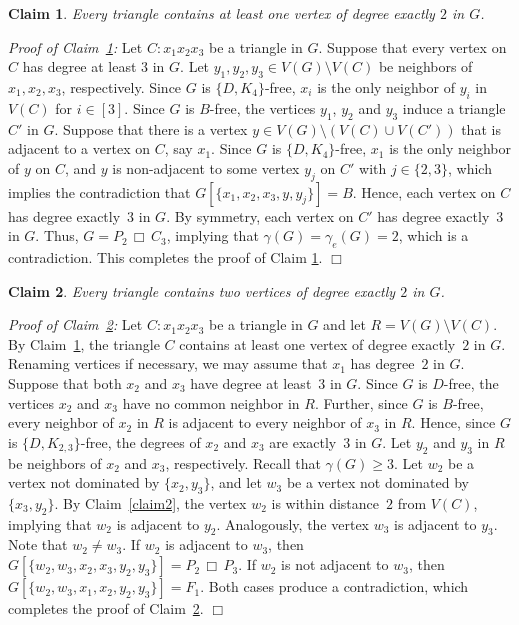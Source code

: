 \documentclass[12pt]{article}
\newtheorem{claim}{Claim}
\newcommand{\cart}{\, \Box \,}
\begin{document}
\begin{claim}\label{claim3}
Every triangle contains at least one vertex of degree exactly $2$ in $G$.
\end{claim}
{\it Proof of Claim~\ref{claim3}:}
Let $C \colon x_1x_2x_3$ be a triangle in $G$.
Suppose that every vertex on $C$ has degree at least $3$ in $G$.
Let $y_1, y_2, y_3\in V(G)\setminus V(C)$ be neighbors of $x_1, x_2, x_3$, respectively.
Since $G$ is $\{ D,K_4\}$-free, $x_i$ is the only neighbor of $y_i$ in $V(C)$ for $i\in [3]$.
Since $G$ is $B$-free, the vertices $y_1$, $y_2$ and $y_3$ induce a triangle $C'$ in $G$.
Suppose that there is a vertex $y\in V(G)\setminus (V(C)\cup V(C'))$ that is adjacent to a vertex on $C$, say $x_1$.
Since $G$ is $\{ D,K_4\}$-free, $x_1$ is the only neighbor of $y$ on $C$,
and $y$ is non-adjacent to some vertex $y_j$ on $C'$ with $j\in \{ 2,3\}$,
which implies the contradiction that $G[\{ x_1,x_2,x_3,y,y_j\}]=B$.
Hence, each vertex on $C$ has degree exactly~$3$ in $G$. 
By symmetry, each vertex on $C'$ has degree exactly~$3$ in $G$. 
Thus, $G = P_2 \cart C_3$, implying that $\gamma(G)=\gamma_e(G)=2$, which is a contradiction. 
This completes the proof of Claim \ref{claim3}.
$\Box$

\begin{claim}\label{claim4}
Every triangle contains two vertices of degree exactly $2$ in $G$.
\end{claim}
{\it Proof of Claim~\ref{claim4}:}
Let $C \colon x_1x_2x_3$ be a triangle in $G$ and let $R=V(G)\setminus V(C)$.
By Claim~\ref{claim3}, the triangle $C$ contains at least one vertex of degree exactly~$2$ in $G$. Renaming vertices if necessary, we may assume that $x_1$ has degree~$2$ in $G$. Suppose that both $x_2$ and $x_3$ have degree at least~$3$ in $G$.
Since $G$ is $D$-free, the vertices $x_2$ and $x_3$ have no common neighbor in $R$.
Further, since $G$ is $B$-free, every neighbor of $x_2$ in $R$ is adjacent to every neighbor of $x_3$ in $R$. Hence, since $G$ is $\{D,K_{2,3}\}$-free, the degrees of $x_2$ and $x_3$ are exactly~$3$ in $G$. 
Let $y_2$ and $y_3$ in $R$ be neighbors of $x_2$ and $x_3$, respectively.
Recall that $\gamma(G) \ge 3$. Let $w_2$ be a vertex not dominated by $\{x_2,y_3\}$, and let $w_3$ be a vertex not dominated by $\{x_3,y_2\}$. By Claim~\ref{claim2}, the vertex $w_2$ is within distance~$2$ from $V(C)$, implying that $w_2$ is adjacent to $y_2$. Analogously, the vertex $w_3$ is adjacent to $y_3$. Note that $w_2 \ne w_3$. If $w_2$ is adjacent to $w_3$, then
$G[\{w_2, w_3,x_2,x_3,y_2,y_3\}]=P_2 \cart P_3$. If $w_2$ is not adjacent to $w_3$, then $G[\{w_2, w_3,x_1,x_2,y_2,y_3\}]=F_1$.
Both cases produce a contradiction, which completes the proof of Claim~\ref{claim4}.
$\Box$
\end{document}
